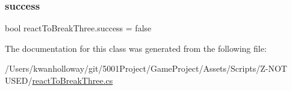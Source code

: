 \subsubsection{\texorpdfstring{success}{success}}
{\footnotesize\ttfamily bool react\+To\+Break\+Three.\+success = false}



The documentation for this class was generated from the following file\+:\begin{DoxyCompactItemize}
\item 
/\+Users/kwanholloway/git/5001\+Project/\+Game\+Project/\+Assets/\+Scripts/\+Z-\/\+N\+O\+T U\+S\+E\+D/\hyperlink{react_to_break_three_8cs}{react\+To\+Break\+Three.\+cs}\end{DoxyCompactItemize}
